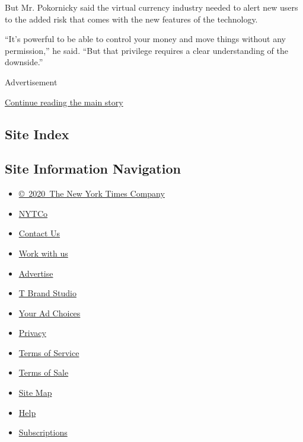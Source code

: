But Mr. Pokornicky said the virtual currency industry needed to alert
new users to the added risk that comes with the new features of the
technology.

``It's powerful to be able to control your money and move things without
any permission,'' he said. ``But that privilege requires a clear
understanding of the downside.''

Advertisement

\protect\hyperlink{after-bottom}{Continue reading the main story}

\hypertarget{site-index}{%
\subsection{Site Index}\label{site-index}}

\hypertarget{site-information-navigation}{%
\subsection{Site Information
Navigation}\label{site-information-navigation}}

\begin{itemize}
\tightlist
\item
  \href{https://help.nytimes.com/hc/en-us/articles/115014792127-Copyright-notice}{©~2020~The
  New York Times Company}
\end{itemize}

\begin{itemize}
\tightlist
\item
  \href{https://www.nytco.com/}{NYTCo}
\item
  \href{https://help.nytimes.com/hc/en-us/articles/115015385887-Contact-Us}{Contact
  Us}
\item
  \href{https://www.nytco.com/careers/}{Work with us}
\item
  \href{https://nytmediakit.com/}{Advertise}
\item
  \href{http://www.tbrandstudio.com/}{T Brand Studio}
\item
  \href{https://www.nytimes.com/privacy/cookie-policy\#how-do-i-manage-trackers}{Your
  Ad Choices}
\item
  \href{https://www.nytimes.com/privacy}{Privacy}
\item
  \href{https://help.nytimes.com/hc/en-us/articles/115014893428-Terms-of-service}{Terms
  of Service}
\item
  \href{https://help.nytimes.com/hc/en-us/articles/115014893968-Terms-of-sale}{Terms
  of Sale}
\item
  \href{https://spiderbites.nytimes.com}{Site Map}
\item
  \href{https://help.nytimes.com/hc/en-us}{Help}
\item
  \href{https://www.nytimes.com/subscription?campaignId=37WXW}{Subscriptions}
\end{itemize}
